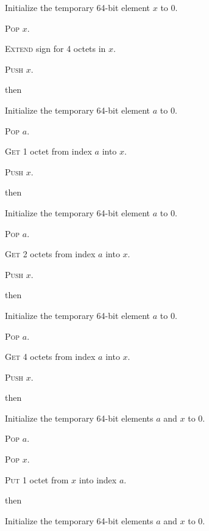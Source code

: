 \documentclass[a4paper,12pt]{article}
\newcommand{\num}[1]{\texttt{#1}}
\newcommand{\hex}[1]{\num{#1}_{\textup{\tiny 16}}}
\newcommand{\proc}[1]{\textsc{#1}}
\newcommand{\op}[1]{$#1$}
\newcommand{\LOADB}     [1]{\op{\hex{10}}}
\newcommand{\LOADS}     [1]{\op{\hex{11}}}
\newcommand{\LOADI}     [1]{\op{\hex{12}}}
\newcommand{\STOREB}    [1]{\op{\hex{14}}}
\newcommand{\STORES}    [1]{\op{\hex{15}}}
\begin{document}
\begin{stepnumbers}[start=3]
\begin{description}
\begin{stepnumbers}
    \item Initialize the temporary 64-bit element $x$ to 0.
    \item \proc{Pop} $x$.
    \item \proc{Extend} sign for 4 octets in $x$.
    \item \proc{Push} $x$.
    \end{stepnumbers}
  \item[\LOADB{}] then
    \begin{stepnumbers}
    \item Initialize the temporary 64-bit element $a$ to 0.
    \item \proc{Pop} $a$.
    \item \proc{Get} 1 octet from index $a$ into $x$.
    \item \proc{Push} $x$.
    \end{stepnumbers}
  \item[\LOADS{}] then
    \begin{stepnumbers}
    \item Initialize the temporary 64-bit element $a$ to 0.
    \item \proc{Pop} $a$.
    \item \proc{Get} 2 octets from index $a$ into $x$.
    \item \proc{Push} $x$.
    \end{stepnumbers}
  \item[\LOADI{}] then
    \begin{stepnumbers}
    \item Initialize the temporary 64-bit element $a$ to 0.
    \item \proc{Pop} $a$.
    \item \proc{Get} 4 octets from index $a$ into $x$.
    \item \proc{Push} $x$.
    \end{stepnumbers}
  \item[\STOREB{}] then
    \begin{stepnumbers}
    \item Initialize the temporary 64-bit elements $a$ and $x$ to 0.
    \item \proc{Pop} $a$.
    \item \proc{Pop} $x$.
    \item \proc{Put} 1 octet from $x$ into index $a$.
    \end{stepnumbers}
  \item[\STORES{}] then
    \begin{stepnumbers}
    \item Initialize the temporary 64-bit elements $a$ and $x$ to 0.

\end{stepnumbers}
\end{description}
\end{stepnumbers}
\end{document}
